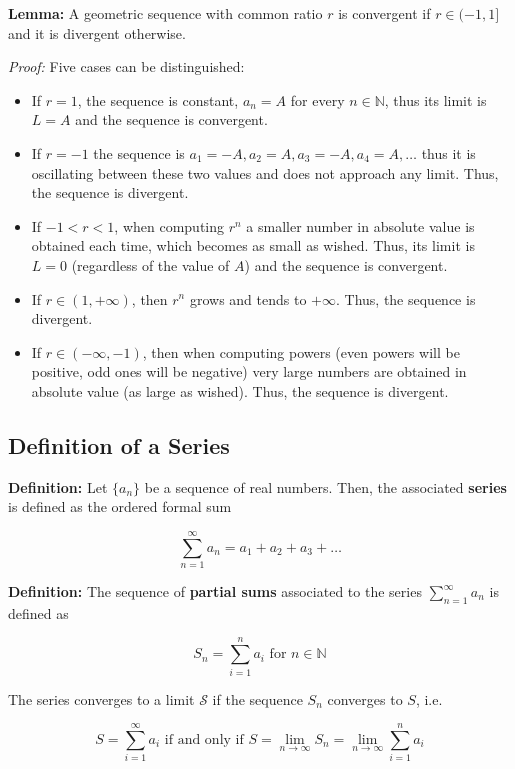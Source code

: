 \documentclass[11pt]{article}
\providecommand{\tightlist}{%
      \setlength{\itemsep}{0pt}\setlength{\parskip}{0pt}}
\begin{document}
{\textbf{Lemma:} A geometric sequence with common ratio \(r\) is
convergent if \(r\in (-1,1]\) and it is divergent otherwise.

\emph{Proof:} Five cases can be distinguished:

\begin{itemize}
\tightlist
\item
  If \(r = 1\), the sequence is constant, \(a_n = A\) for every
  \(n\in\mathbb{N}\), thus its limit is \(L = A\) and the sequence is
  convergent.
\item
  If \(r = -1\) the sequence is
  \(a_1 = -A, a_2 = A, a_3 = -A, a_4 = A, \ldots\) thus it is
  oscillating between these two values and does not approach any limit.
  Thus, the sequence is divergent.
\item
  If \(-1 < r < 1\), when computing \(r^n\) a smaller number in absolute
  value is obtained each time, which becomes as small as wished. Thus,
  its limit is \(L = 0\) (regardless of the value of \(A\)) and the
  sequence is convergent.
\item
  If \(r\in (1,+\infty)\), then \(r^n\) grows and tends to \(+\infty\).
  Thus, the sequence is divergent.
\item
  If \(r\in(-\infty, -1)\), then when computing powers (even powers will
  be positive, odd ones will be negative) very large numbers are
  obtained in absolute value (as large as wished). Thus, the sequence is
  divergent.
\end{itemize}

\hypertarget{definition-of-a-series}{%
\subsection{Definition of a Series}\label{definition-of-a-series}}

\textbf{Definition:} Let \(\{a_n\}\) be a sequence of real numbers.
Then, the associated \textbf{series} is defined as the ordered formal
sum

\[
\sum^{\infty}_{n=1} a_n = a_1 + a_2 + a_3 + \ldots
\]

\textbf{Definition:} The sequence of \textbf{partial sums} associated to
the series \(\sum^{\infty}_{n=1}a_n\) is defined as

\[
S_n = \sum^n_{i=1} a_i \text{ for } n\in\mathbb{N}
\]

The series converges to a limit \(\mathcal{S}\) if the sequence \(S_n\)
converges to \(S\), i.e.

\[
S = \sum^{\infty}_{i=1} a_i \text{ if and only if } S = \lim_{n\rightarrow\infty} S_n = \lim_{n\rightarrow\infty}\sum^n_{i=1} a_i
\]

}
\end{document}
